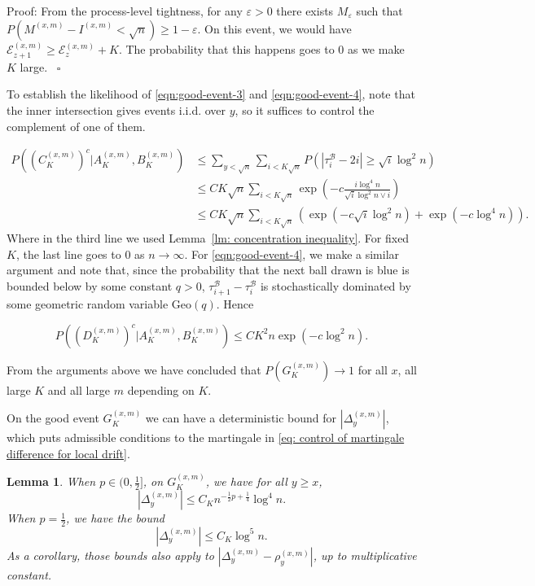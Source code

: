 \documentclass[twoside,12pt,a4paper]{article}
\newtheorem{lemma}{Lemma}[section]
\numberwithin{equation}{section}
\newenvironment{proof}{{\sc Proof}:}{~\hfill $\square$}
\begin{document}
{\begin{proof}
	From the process-level tightness, for any $\varepsilon>0$ there exists $M_\varepsilon$ such that $P\left( M^{(x,m)} - I^{(x,m)} < \sqrt{n}  \right) \ge 1 - \varepsilon$. On this event, we would have $\mathcal{E}_{z+1}^{(x,m)} \ge \mathcal{E}_{z}^{(x,m)} + K$. The probability that this happens goes to $0$ as we make $K$ large.
\end{proof}

To establish the likelihood of \eqref{eqn:good-event-3} and \eqref{eqn:good-event-4}, note that the inner intersection gives events i.i.d. over $y$, so it suffices to control the complement of one of them.

\begin{align*}
	P\left(\left( C_{K}^{(x,m)}\right)^c |A_{K}^{(x,m)}, B_K^{(x,m)}\right) 
	&\le \sum_{y < \sqrt{n} }\sum_{i < K \sqrt{ n} } P\left( |\tau_i^{\mathcal{B}} - 2i| \ge \sqrt{i} \log^2 n \right) \\
	&\le CK \sqrt{n} \sum_{i < K \sqrt{ n} } \exp\left( - c \frac{i \log^4 n}{\sqrt{i}  \log^2 n \vee i} \right)  \\
	&\le CK \sqrt{n}  \sum_{i < K \sqrt{ n} }  
	\left( \exp\left( - c \sqrt{i}  \log^2 n \right)  + 
	\exp\left( - c \log^4 n \right) \right)
.\end{align*}
Where in the third line we used Lemma~\ref{lm: concentration inequality}. For fixed $K$, the last line goes to $0$ as $n \to \infty $. For \eqref{eqn:good-event-4}, we make a similar argument and note that, since the probability that the next ball drawn is blue is bounded below by some constant $q > 0$, $\tau_{i+1}^{\mathcal{B}} - \tau_{i}^{\mathcal{B}}$ is stochastically dominated by some geometric random variable $\text{Geo}(q)$. Hence

\[
	P\left(\left( D_{K}^{(x,m)}\right)^c |A_{K}^{(x,m)}, B_K^{(x,m)}\right) 
	\le C K^2 n \exp\left( - c \log^2 n \right) 
.\] 

From the arguments above we have concluded that $P\left( G_K^{(x,m)} \right)  \to 1$ for all $x$, all large $K$ and all large $m$ depending on $K$.

On the good event $G_{K}^{(x,m)}$ we can have a deterministic bound for $|\Delta_y^{(x,m)}|$, which puts admissible conditions to the martingale in \eqref{eq: control of martingale difference for local drift}.

\begin{lemma}\label{lm:lipchitz-bound-on-good-event}
	When $p \in (0,\frac{1}{2}]$, on $G_{K}^{(x,m)}$, we have for all  $y \ge x$,
	\[
		\left| \Delta_y^{(x,m)} \right| \le C_K n^{-\frac{1}{2}p + \frac{1}{4}} \log^4 n
	.\] 
	When $p = \frac{1}{2}$, we have the bound
\[
		\left| \Delta_y^{(x,m)} \right| \le C_K \log^5 n
	.\]
	As a corollary, those bounds also apply to $\left| \Delta_y^{(x,m)} - \rho_y^{(x,m)} \right| $, up to multiplicative constant.
\end{lemma}

}
\end{document}
